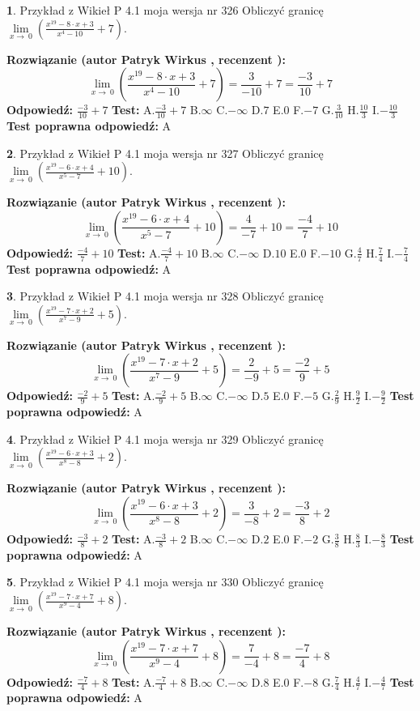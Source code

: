 \documentclass[12pt, a4paper]{article}
\theoremstyle{definition} %
\newtheorem{zad}{}
\newcommand{\zadStart}[1]{\begin{zad}#1\newline}
\newcommand{\zadStop}{\end{zad}}
\newcommand{\rozwStart}[2]{\noindent \textbf{Rozwiązanie (autor #1 , recenzent #2): }\newline}
\newcommand{\rozwStop}{\newline}
\newcommand{\odpStart}{\noindent \textbf{Odpowiedź:}\newline}
\newcommand{\odpStop}{\newline}
\newcommand{\testStart}{\noindent \textbf{Test:}\newline}
\newcommand{\testStop}{\newline}
\newcommand{\kluczStart}{\noindent \textbf{Test poprawna odpowiedź:}\newline}
\newcommand{\kluczStop}{\newline}
\begin{document}
\zadStart{Przykład z Wikieł P 4.1 moja wersja nr 326}
Obliczyć granicę $\lim\limits_{x\to\ 0}(\frac{x^{19}-8 \cdot x +3}{x^{4}-10}+7)$.
\zadStop
\rozwStart{Patryk Wirkus}{}
$$\lim\limits_{x\to\ 0}(\frac{x^{19}-8 \cdot x +3}{x^{4}-10}+7)=\frac{3}{-10}+7=\frac{-3}{10}+7$$
\rozwStop
\odpStart
$\frac{-3}{10}+7$
\odpStop
\testStart
A.$\frac{-3}{10}+7$
B.$\infty$
C.$-\infty$
D.$7$
E.$0$
F.$-7$
G.$\frac{3}{10}$
H.$\frac{10}{3}$
I.$-\frac{10}{3}$
\testStop
\kluczStart
A
\kluczStop



\zadStart{Przykład z Wikieł P 4.1 moja wersja nr 327}
Obliczyć granicę $\lim\limits_{x\to\ 0}(\frac{x^{19}-6 \cdot x +4}{x^{5}-7}+10)$.
\zadStop
\rozwStart{Patryk Wirkus}{}
$$\lim\limits_{x\to\ 0}(\frac{x^{19}-6 \cdot x +4}{x^{5}-7}+10)=\frac{4}{-7}+10=\frac{-4}{7}+10$$
\rozwStop
\odpStart
$\frac{-4}{7}+10$
\odpStop
\testStart
A.$\frac{-4}{7}+10$
B.$\infty$
C.$-\infty$
D.$10$
E.$0$
F.$-10$
G.$\frac{4}{7}$
H.$\frac{7}{4}$
I.$-\frac{7}{4}$
\testStop
\kluczStart
A
\kluczStop



\zadStart{Przykład z Wikieł P 4.1 moja wersja nr 328}
Obliczyć granicę $\lim\limits_{x\to\ 0}(\frac{x^{19}-7 \cdot x +2}{x^{7}-9}+5)$.
\zadStop
\rozwStart{Patryk Wirkus}{}
$$\lim\limits_{x\to\ 0}(\frac{x^{19}-7 \cdot x +2}{x^{7}-9}+5)=\frac{2}{-9}+5=\frac{-2}{9}+5$$
\rozwStop
\odpStart
$\frac{-2}{9}+5$
\odpStop
\testStart
A.$\frac{-2}{9}+5$
B.$\infty$
C.$-\infty$
D.$5$
E.$0$
F.$-5$
G.$\frac{2}{9}$
H.$\frac{9}{2}$
I.$-\frac{9}{2}$
\testStop
\kluczStart
A
\kluczStop



\zadStart{Przykład z Wikieł P 4.1 moja wersja nr 329}
Obliczyć granicę $\lim\limits_{x\to\ 0}(\frac{x^{19}-6 \cdot x +3}{x^{8}-8}+2)$.
\zadStop
\rozwStart{Patryk Wirkus}{}
$$\lim\limits_{x\to\ 0}(\frac{x^{19}-6 \cdot x +3}{x^{8}-8}+2)=\frac{3}{-8}+2=\frac{-3}{8}+2$$
\rozwStop
\odpStart
$\frac{-3}{8}+2$
\odpStop
\testStart
A.$\frac{-3}{8}+2$
B.$\infty$
C.$-\infty$
D.$2$
E.$0$
F.$-2$
G.$\frac{3}{8}$
H.$\frac{8}{3}$
I.$-\frac{8}{3}$
\testStop
\kluczStart
A
\kluczStop



\zadStart{Przykład z Wikieł P 4.1 moja wersja nr 330}
Obliczyć granicę $\lim\limits_{x\to\ 0}(\frac{x^{19}-7 \cdot x +7}{x^{9}-4}+8)$.
\zadStop
\rozwStart{Patryk Wirkus}{}
$$\lim\limits_{x\to\ 0}(\frac{x^{19}-7 \cdot x +7}{x^{9}-4}+8)=\frac{7}{-4}+8=\frac{-7}{4}+8$$
\rozwStop
\odpStart
$\frac{-7}{4}+8$
\odpStop
\testStart
A.$\frac{-7}{4}+8$
B.$\infty$
C.$-\infty$
D.$8$
E.$0$
F.$-8$
G.$\frac{7}{4}$
H.$\frac{4}{7}$
I.$-\frac{4}{7}$
\testStop
\kluczStart
A
\kluczStop
\end{document}
